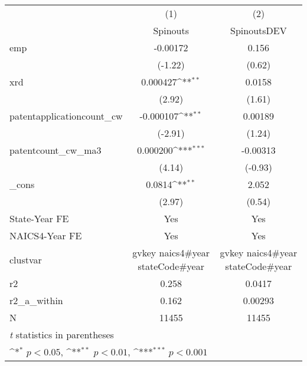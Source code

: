 {
\def\sym#1{\ifmmode^{#1}\else\(^{#1}\)\fi}
\begin{tabular}{l*{2}{c}}
\hline\hline
            &\multicolumn{1}{c}{(1)}&\multicolumn{1}{c}{(2)}\\
            &\multicolumn{1}{c}{Spinouts}&\multicolumn{1}{c}{SpinoutsDEV}\\
\hline
emp         &    -0.00172         &       0.156         \\
            &     (-1.22)         &      (0.62)         \\
[1em]
xrd         &    0.000427\sym{**} &      0.0158         \\
            &      (2.92)         &      (1.61)         \\
[1em]
patentapplicationcount\_cw&   -0.000107\sym{**} &     0.00189         \\
            &     (-2.91)         &      (1.24)         \\
[1em]
patentcount\_cw\_ma3&    0.000200\sym{***}&    -0.00313         \\
            &      (4.14)         &     (-0.93)         \\
[1em]
\_cons      &      0.0814\sym{**} &       2.052         \\
            &      (2.97)         &      (0.54)         \\
[1em]
State-Year FE&         Yes         &         Yes         \\
[1em]
NAICS4-Year FE&         Yes         &         Yes         \\
\hline
clustvar    &gvkey naics4#year stateCode#year         &gvkey naics4#year stateCode#year         \\
r2          &       0.258         &      0.0417         \\
r2\_a\_within &       0.162         &     0.00293         \\
N           &       11455         &       11455         \\
\hline\hline
\multicolumn{3}{l}{\footnotesize \textit{t} statistics in parentheses}\\
\multicolumn{3}{l}{\footnotesize \sym{*} \(p<0.05\), \sym{**} \(p<0.01\), \sym{***} \(p<0.001\)}\\
\end{tabular}
}
